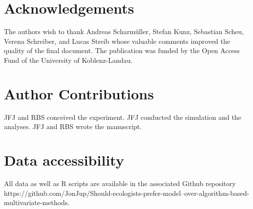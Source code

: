\documentclass[a4paper,11pt]{article}
\begin{document}
\section*{Acknowledgements}
The authors wish to thank Andreas Scharmüller, Stefan Kunz, Sebastian Scheu, Verena Schreiber, and Lucas Streib whose valuable comments  improved the quality of the final document. The publication was funded by the Open Access Fund of the University of Koblenz-Landau.
\section*{Author Contributions}
JFJ and RBS conceived the experiment. JFJ conducted the simulation and the analyses. JFJ and RBS wrote the manuscript.
\section*{Data accessibility}
All data as well as R scripts are available in the associated Github repository\\
https://github.com/JonJup/Should-ecologists-prefer-model--over-algorithm-based-multivariate-methods. 

\end{document}
